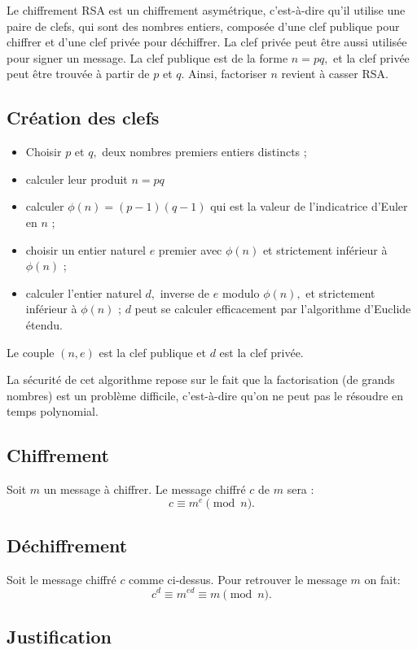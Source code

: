 \documentclass[french, 12pt, titlepage]{article}
\newenvironment{itemH}[0]{\begin{itemize}[label=$\bullet$, font=\color{black} \large]}{\end{itemize}}
\begin{document}
Le chiffrement RSA est un chiffrement asymétrique, c'est-à-dire qu'il utilise une paire de clefs, qui sont des nombres entiers, composée d'une clef publique pour chiffrer et d'une clef privée pour déchiffrer.
La clef privée peut être aussi utilisée pour signer un message. La clef publique est de la forme $n = pq,$ et la clef privée peut être trouvée à partir de $p$ et $q.$ Ainsi, factoriser $n$ revient à casser RSA.

\subsection{Création des clefs}

\begin{itemH}
\item Choisir $p$ et $q,$ deux nombres premiers entiers distincts ;
\item calculer leur produit $n = pq$
\item calculer $\phi (n) = (p - 1)(q - 1)$ qui est la valeur de l'indicatrice d'Euler en $n$ ;
\item choisir un entier naturel $e$ premier avec $\phi (n)$ et strictement inférieur à $\phi (n)$ ;
\item calculer l'entier naturel $d,$ inverse de $e$ modulo $ \phi (n),$ et strictement inférieur à $\phi (n)$ ; $d$ peut se calculer efficacement par l'algorithme d'Euclide étendu.
\end{itemH}

Le couple $(n, e)$ est la clef publique et $d$ est la clef privée.

La sécurité de cet algorithme repose sur le fait que la factorisation (de grands nombres) est un problème difficile, c'est-à-dire qu'on ne peut pas le résoudre en temps polynomial.

\subsection{Chiffrement}
Soit $m$ un message à chiffrer. Le message chiffré $c$ de $m$ sera :
\[ c \equiv m^e \pmod n .\]
\subsection{Déchiffrement}

Soit le message chiffré $c$ comme ci-dessus. Pour retrouver le message $m$ on fait:
\[ c^d \equiv m^{ed} \equiv m \pmod n.\]

\subsection{Justification}
\end{document}
